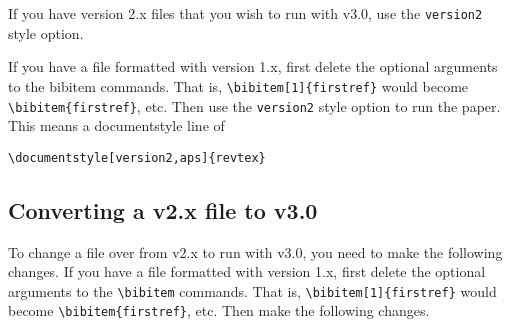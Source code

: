 If you have version 2.x files that you wish to run with v3.0, use the
\verb+version2+ style option.

If you have a file formatted with version 1.x, first delete the optional
arguments to the bibitem commands. That is, \verb+\bibitem[1]{firstref}+
would become \verb+\bibitem{firstref}+, etc. Then use the \verb+version2+
style option to run the paper. This means a documentstyle line of
\begin{verbatim}
\documentstyle[version2,aps]{revtex}
\end{verbatim}


\subsection{Converting a \REVTeX{} v2.x file to \REVTeX{} v3.0}

To change a file over from v2.x to run with v3.0, you need to make the
following changes. If you have a file formatted with version 1.x, first
delete the optional arguments to the \verb+\bibitem+ commands. That is,
\verb+\bibitem[1]{firstref}+ would become \verb+\bibitem{firstref}+, etc.
Then make the following changes.

